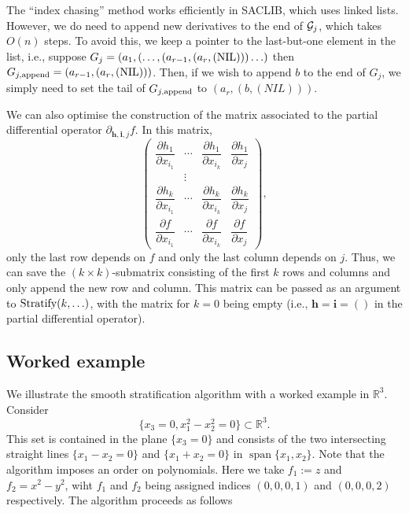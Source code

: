 \documentclass[
]{book}
\theoremstyle{definition}
\theoremstyle{definition}
\theoremstyle{definition}
\theoremstyle{definition}
\theoremstyle{remark}
\begin{document}
The ``index chasing'' method works efficiently in SACLIB, which uses linked lists. However, we do need to append new derivatives to the end of \({\cal G}_j\), which takes \(O(n)\) steps.
To avoid this, we keep a pointer to the last-but-one element in the list, i.e., suppose \(G_j = (a_1,(\ldots,(a_{r-1},(a_r,(\rm{NIL})))\ldots)\) then \(G_{j,\rm{append}} = (a_{r-1},(a_r,(\rm{NIL})))\). Then, if we wish to append \(b\) to the end of \(G_j\), we simply need to set the tail of \(G_{j,\rm{append}}\) to \((a_r,(b,(NIL)))\).

We can also optimise the construction of the matrix associated to the partial differential operator \(\partial_{\mathbf{h},\mathbf{i},j} f\). In this matrix,
\[
\begin{pmatrix}\dfrac{\partial h_{1}}{\partial x_{i_{1}}} & \cdots & \dfrac{\partial h_{1}}{\partial x_{i_{k}}} & \dfrac{\partial h_{1}}{\partial x_{j}}\\
 & \vdots\\
\dfrac{\partial h_{k}}{\partial x_{i_{1}}} & \cdots & \dfrac{\partial h_{k}}{\partial x_{i_{k}}} & \dfrac{\partial h_{k}}{\partial x_{j}}\\
\dfrac{\partial f}{\partial x_{i_{1}}} & \cdots & \dfrac{\partial f}{\partial x_{i_{k}}} & \dfrac{\partial f}{\partial x_{j}}
\end{pmatrix},
\]
only the last row depends on \(f\) and only the last column depends on \(j\). Thus, we can save the \((k\times k)\)-submatrix consisting of the first \(k\) rows and columns and only append the new row and column. This matrix can be passed as an argument to \({\rm Stratify}(k,\ldots)\), with the matrix for \(k=0\) being empty (i.e., \(\mathbf{h} = \mathbf{i} = ()\) in the partial differential operator).

\hypertarget{sec:strat-worked-example}{%
\subsection{Worked example}\label{sec:strat-worked-example}}

We illustrate the smooth stratification algorithm with a worked example in \(\mathbb{R}^3\). Consider
\[
\{ x_3 = 0, x_1^2-x_2^2=0 \} \subset \mathbb{R}^3.
\]
This set is contained in the plane \(\{ x_3 = 0 \}\) and consists of the two intersecting straight lines \(\{ x_1 - x_2 = 0 \}\) and \(\{ x_1 + x_2 = 0 \}\) in \({\operatorname{span} \{x_1,x_2\}}\).
Note that the algorithm imposes an order on polynomials. Here we take \(f_1 := z\) and \(f_2 = x^2 - y^2\), wiht \(f_1\) and \(f_2\) being assigned indices \((0,0,0,1)\) and \((0,0,0,2)\) respectively.
The algorithm proceeds as follows
\end{document}
